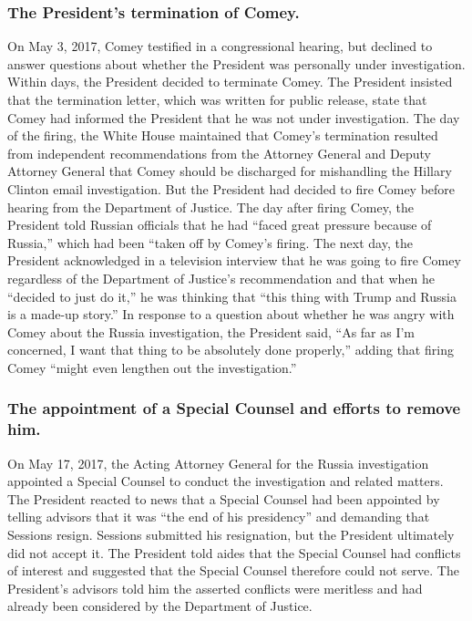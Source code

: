 \subsubsection*{The President’s termination of Comey.}

On May 3, 2017, Comey testified in a congressional hearing, but declined to answer questions about whether the President was personally under investigation.
Within days, the President decided to terminate Comey.
The President insisted that the termination letter, which was written for public release, state that Comey had informed the President that he was not under investigation.
The day of the firing, the White House maintained that Comey’s termination resulted from independent recommendations from the Attorney General and Deputy Attorney General that Comey should be discharged for mishandling the Hillary Clinton email investigation.
But the President had decided to fire Comey before hearing from the Department of Justice.
The day after firing Comey, the President told Russian officials that he had “faced great pressure because of Russia,” which had been “taken off by Comey’s firing.
The next day, the President acknowledged in a television interview that he was going to fire Comey regardless of the Department of Justice’s recommendation and that when he “decided to just do it,” he was thinking that “this thing with Trump and Russia is a made-up story.”
In response to a question about whether he was angry with Comey about the Russia investigation, the President said, “As far as I’m concerned, I want that thing to be absolutely done properly,” adding that firing Comey “might even lengthen out the investigation.”

\subsubsection*{The appointment of a Special Counsel and efforts to remove him.}

On May 17, 2017, the Acting Attorney General for the Russia investigation appointed a Special Counsel to conduct the investigation and related matters.
The President reacted to news that a Special Counsel had been appointed by telling advisors that it was “the end of his presidency” and demanding that Sessions resign.
Sessions submitted his resignation, but the President ultimately did not accept it.
The President told aides that the Special Counsel had conflicts of interest and suggested that the Special Counsel therefore could not serve.
The President’s advisors told him the asserted conflicts were meritless and had already been considered by the Department of Justice.


